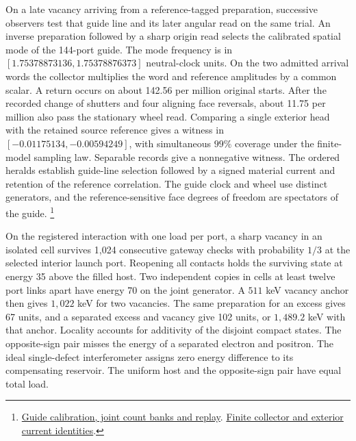 \documentclass[11pt]{article}
\theoremstyle{definition}
\theoremstyle{remark}
\theoremstyle{plain}
\begin{document}
On a late vacancy arriving from a reference-tagged preparation,
successive observers test that guide line and its later angular read
on the same trial. An inverse preparation followed by a sharp origin
read selects the calibrated spatial mode of the 144-port guide.
The mode frequency is in
\([1.75378873136,1.75378876373]\) neutral-clock units. On the two
admitted arrival words the collector multiplies the word and reference
amplitudes by a common scalar. A return occurs on about
142.56 per million original starts. After the recorded change of
shutters and four aligning face reversals, about 11.75 per million also
pass the stationary wheel read. Comparing a single exterior head with
the retained source reference gives a witness in
\([-0.01175134,-0.00594249]\), with simultaneous \(99\%\) coverage
under the finite-model sampling law. Separable records give a
nonnegative witness. The ordered heralds establish guide-line
selection followed by a signed material current and retention of
the reference correlation. The guide clock and wheel use distinct
generators, and the reference-sensitive face degrees of freedom
are spectators of the guide.%
\footnote{\href{https://github.com/FloatingPragma/observer-patch-holography/tree/main/model/candidate_laws/interval_echo/openwave/electron_field/fan_path/local_launch/material_loop/five_faces/exterior_meter}{Guide calibration, joint count banks and replay}.
\href{https://github.com/FloatingPragma/observer-patch-holography/blob/main/Lean/SourceLaw/ExteriorHeadCurrent.lean}{Finite collector and exterior current identities}.}

On the registered interaction with one load per port, a sharp vacancy
in an isolated cell survives 1,024 consecutive gateway checks with
probability $1/3$ at the selected interior launch port. Reopening all
contacts holds the surviving state at energy 35 above the filled host.
Two independent copies in cells at least twelve port links apart have
energy 70 on the joint generator. A $511$ keV vacancy anchor then
gives $1{,}022$ keV for two vacancies. The same preparation for an
excess gives 67 units, and a separated excess and vacancy give 102
units, or $1{,}489.2$ keV with that anchor. Locality accounts for
additivity of the disjoint compact states. The opposite-sign pair
misses the energy of a separated electron and positron. The ideal
single-defect interferometer assigns zero energy difference to its
compensating reservoir. The uniform host and the opposite-sign pair
have equal total load.
\end{document}
